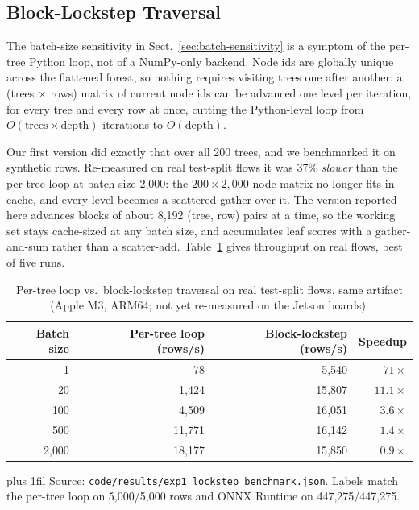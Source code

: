 \documentclass[runningheads]{llncs}
\newcommand{\tabnote}[1]{%
  \vspace{4pt}\par\noindent
  \begin{minipage}{\textwidth}%
    \footnotesize\parindent=0pt\leftskip=0pt\rightskip=0pt\parfillskip=0pt plus 1fil\relax
    #1%
  \end{minipage}}
\begin{document}
\subsection{Block-Lockstep Traversal}
\label{sec:lockstep}

The batch-size sensitivity in Sect.~\ref{sec:batch-sensitivity} is a symptom of the per-tree Python loop, not of a NumPy-only backend. Node ids are globally unique across the flattened forest, so nothing requires visiting trees one after another: a (trees $\times$ rows) matrix of current node ids can be advanced one level per iteration, for every tree and every row at once, cutting the Python-level loop from $O(\text{trees} \times \text{depth})$ iterations to $O(\text{depth})$.

Our first version did exactly that over all 200 trees, and we benchmarked it on synthetic rows. Re-measured on real test-split flows it was 37\% \emph{slower} than the per-tree loop at batch size 2{,}000: the $200 \times 2{,}000$ node matrix no longer fits in cache, and every level becomes a scattered gather over it. The version reported here advances blocks of about 8{,}192 (tree, row) pairs at a time, so the working set stays cache-sized at any batch size, and accumulates leaf scores with a gather-and-sum rather than a scatter-add. Table~\ref{tab:lockstep} gives throughput on real flows, best of five runs.

\begin{table}[htbp]
  \caption{Per-tree loop vs.\ block-lockstep traversal on real test-split flows, same artifact (Apple M3, ARM64; not yet re-measured on the Jetson boards).}
  \label{tab:lockstep}
  \centering
  \small
  \begin{tabular}{r r r r}
    \toprule
    Batch size & Per-tree loop (rows/s) & Block-lockstep (rows/s) & Speedup \\
    \midrule
    1      & 78       & 5{,}540  & $71\times$ \\
    20     & 1{,}424  & 15{,}807 & $11.1\times$ \\
    100    & 4{,}509  & 16{,}051 & $3.6\times$ \\
    500    & 11{,}771 & 16{,}142 & $1.4\times$ \\
    2{,}000 & 18{,}177 & 15{,}850 & $0.9\times$ \\
    \bottomrule
  \end{tabular}
  \tabnote{Source: \texttt{code/results/exp1\_lockstep\_benchmark.json}. Labels match the per-tree loop on 5{,}000/5{,}000 rows and ONNX Runtime on 447{,}275/447{,}275.}
\end{table}
\end{document}
